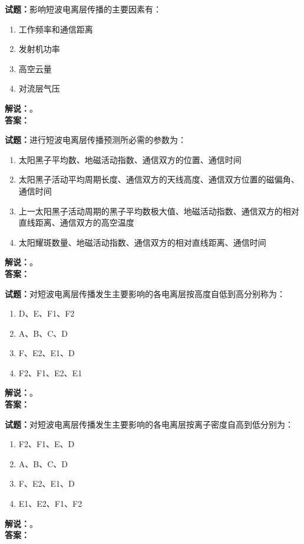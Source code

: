 \documentclass{ctexbook}
\begin{document}
\bigskip




\noindent\textbf{试题：}影响短波电离层传播的主要因素有：
\begin{enumerate}[leftmargin=3em]
\item 工作频率和通信距离
\item 发射机功率
\item 高空云量
\item 对流层气压
\end{enumerate}
\noindent\textbf{解说：}\textbf{}。\\\noindent\textbf{答案：}

\bigskip




\noindent\textbf{试题：}进行短波电离层传播预测所必需的参数为：
\begin{enumerate}[leftmargin=3em]
\item 太阳黑子平均数、地磁活动指数、通信双方的位置、通信时间
\item 太阳黑子活动平均周期长度、通信双方的天线高度、通信双方位置的磁偏角、通信时间
\item 上一太阳黑子活动周期的黑子平均数极大值、地磁活动指数、通信双方的相对直线距离、通信双方的高空温度
\item 太阳耀斑数量、地磁活动指数、通信双方的相对直线距离、通信时间
\end{enumerate}
\noindent\textbf{解说：}\textbf{}。\\\noindent\textbf{答案：}

\bigskip




\noindent\textbf{试题：}对短波电离层传播发生主要影响的各电离层按高度自低到高分别称为：
\begin{enumerate}[leftmargin=3em]
\item D、E、F1、F2
\item A、B、C、D
\item F、E2、E1、D
\item F2、F1、E2、E1
\end{enumerate}
\noindent\textbf{解说：}\textbf{}。\\\noindent\textbf{答案：}

\bigskip




\noindent\textbf{试题：}对短波电离层传播发生主要影响的各电离层按离子密度自高到低分别为：
\begin{enumerate}[leftmargin=3em]
\item F2、F1、E、D
\item A、B、C、D
\item F、E2、E1、D
\item E1、E2、F1、F2
\end{enumerate}
\noindent\textbf{解说：}\textbf{}。\\\noindent\textbf{答案：}
\end{document}
